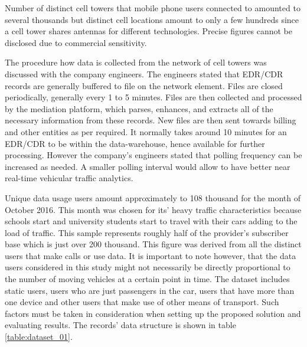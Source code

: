 \documentclass[12pt, a4paper]{report}
\theoremstyle{definition}
\theoremstyle{definition}%
\theoremstyle{definition}%
\theoremstyle{definition}%
\theoremstyle{definition}%
\theoremstyle{definition}%
\begin{document}
Number of distinct cell towers that mobile phone users connected to amounted to several thousands but distinct cell locations amount to only a few hundreds since a cell tower shares antennas for different technologies. Precise figures cannot be disclosed due to commercial sensitivity.

The procedure how data is collected from the network of cell towers was discussed with the company engineers. The engineers stated that EDR/CDR records are generally buffered to file on the network element. Files are closed periodically, generally every 1 to 5 minutes. Files are then collected and processed by the mediation platform, which parses, enhances, and extracts all of the necessary information from these records. New files are then sent towards billing and other entities as per required. It normally takes around 10 minutes for an EDR/CDR to be within the data-warehouse, hence available for further processing. However the company's engineers stated that polling frequency can be increased as needed. A smaller polling interval would allow to have better near real-time vehicular traffic analytics.

Unique data usage users amount approximately to 108 thousand for the month of October 2016. This month was chosen for its' heavy traffic characteristics because schools start and university students start to travel with their cars adding to the load of traffic. This sample represents roughly half of the provider's subscriber base which is just over 200 thousand. This figure was derived from all the distinct users that make calls or use data. It is important to note however, that the data users considered in this study might not necessarily be directly proportional to the number of moving vehicles at a certain point in time. The dataset includes static users, users who are just passengers in the car, users that have more than one device and other users that make use of other means of transport. Such factors must be taken in consideration when setting up the proposed solution and evaluating results. The records' data structure is shown in table \ref{table:dataset_01}.

\end{document}
